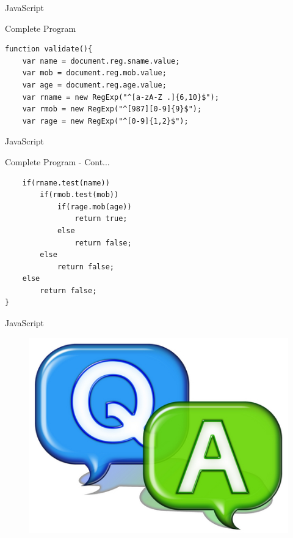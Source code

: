 \documentclass[14pt]{beamer}
\begin{document}
\begin{frame}[fragile]{JavaScript}
\begin{block}{Complete Program}
\begin{lstlisting}
function validate(){
    var name = document.reg.sname.value;
    var mob = document.reg.mob.value;
    var age = document.reg.age.value;
    var rname = new RegExp("^[a-zA-Z .]{6,10}$");
    var rmob = new RegExp("^[987][0-9]{9}$");
    var rage = new RegExp("^[0-9]{1,2}$");
\end{lstlisting}
\end{block}
\end{frame}

\begin{frame}[fragile]{JavaScript}
\begin{block}{Complete Program - Cont...}
\begin{lstlisting}
    if(rname.test(name))
        if(rmob.test(mob))
            if(rage.mob(age))
                return true;
            else
                return false;
        else
            return false;
    else
        return false;
}
\end{lstlisting}
\end{block}
\end{frame}

\begin{frame}{JavaScript}
 \begin{figure}[H]
    \includegraphics[scale=.3]{qa.png}   
   \end{figure}
\end{frame}
\end{document}
